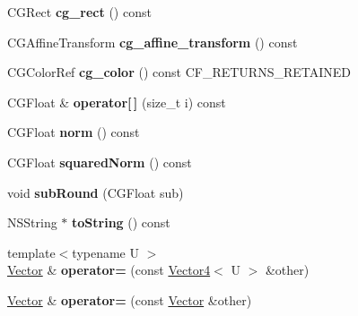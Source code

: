 \begin{DoxyCompactItemize}
\mbox{\label{class_p_o_p_1_1_vector_affa7437c791d44704ab0310240966e77}} 
C\+G\+Rect {\bfseries cg\+\_\+rect} () const
\item 
\mbox{\label{class_p_o_p_1_1_vector_aaeb39972cf34353199146cadd9fae244}} 
C\+G\+Affine\+Transform {\bfseries cg\+\_\+affine\+\_\+transform} () const
\item 
\mbox{\label{class_p_o_p_1_1_vector_acac9656c405805a0625665a65c6e44da}} 
C\+G\+Color\+Ref {\bfseries cg\+\_\+color} () const C\+F\+\_\+\+R\+E\+T\+U\+R\+N\+S\+\_\+\+R\+E\+T\+A\+I\+N\+ED
\item 
\mbox{\label{class_p_o_p_1_1_vector_a51bd97eaabcb0dd09c862e7ee327fd0d}} 
C\+G\+Float \& {\bfseries operator\mbox{[}$\,$\mbox{]}} (size\+\_\+t i) const
\item 
\mbox{\label{class_p_o_p_1_1_vector_a7e6c41fccd5dd761f8c8ab3e426fbf19}} 
C\+G\+Float {\bfseries norm} () const
\item 
\mbox{\label{class_p_o_p_1_1_vector_a6973ef771e5ef4b96c6c61860a1c6f6d}} 
C\+G\+Float {\bfseries squared\+Norm} () const
\item 
\mbox{\label{class_p_o_p_1_1_vector_ac9bf325f3c217c84d853436ebac0a314}} 
void {\bfseries sub\+Round} (C\+G\+Float sub)
\item 
\mbox{\label{class_p_o_p_1_1_vector_a44d36cf9e94c7691835ab61874a358c1}} 
N\+S\+String $\ast$ {\bfseries to\+String} () const
\item 
\mbox{\label{class_p_o_p_1_1_vector_a3453193c28aaa1a46b542e9c4735a419}} 
{\footnotesize template$<$typename U $>$ }\\\mbox{\hyperlink{class_p_o_p_1_1_vector}{Vector}} \& {\bfseries operator=} (const \mbox{\hyperlink{struct_p_o_p_1_1_vector4}{Vector4}}$<$ U $>$ \&other)
\item 
\mbox{\label{class_p_o_p_1_1_vector_a181d21c3247bcb87fd6fdff5443cac40}} 
\mbox{\hyperlink{class_p_o_p_1_1_vector}{Vector}} \& {\bfseries operator=} (const \mbox{\hyperlink{class_p_o_p_1_1_vector}{Vector}} \&other)

\end{DoxyCompactItemize}
